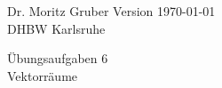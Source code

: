 




\vspace*{-20mm}
{
	\color{dhbwGray}
	Dr. Moritz Gruber	\hfill Version \today\\
	DHBW Karlsruhe\\

}

\vspace{10mm}
\begin{center}
	{
		\color{lightBlue}
		{ \LARGE 	\"Ubungsaufgaben 6}\\[3mm]
		{\Large Vektorr\"aume}
	}
\end{center}

\vspace{5mm}

